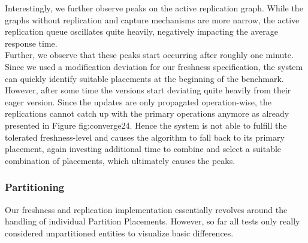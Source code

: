 Interestingly, we further observe peaks on the active replication graph. While the graphs without replication and capture mechanisms are more narrow,
the active replication queue oscillates quite heavily, negatively  impacting the average response time.\\
Further, we observe that these peaks start occurring after roughly one minute.
Since we used a modification deviation for our freshness specification, the system can quickly identify suitable placements at the beginning of the benchmark.
However, after some time the versions start deviating quite heavily from their eager version.
Since the updates are only propagated operation-wise, the replications cannot catch up with the primary operations anymore as already presented in Figure \refname{fig:converge24}.
Hence the system is not able to fulfill the tolerated freshness-level and
causes the algorithm to fall back to its primary placement, again investing additional time to combine and select a suitable combination of placements, which ultimately causes the peaks.




\subsubsection{Partitioning} 

Our freshness and replication implementation essentially revolves around the handling of individual Partition Placements.
However, so far all tests only really considered unpartitioned entities to visualize basic differences. 

